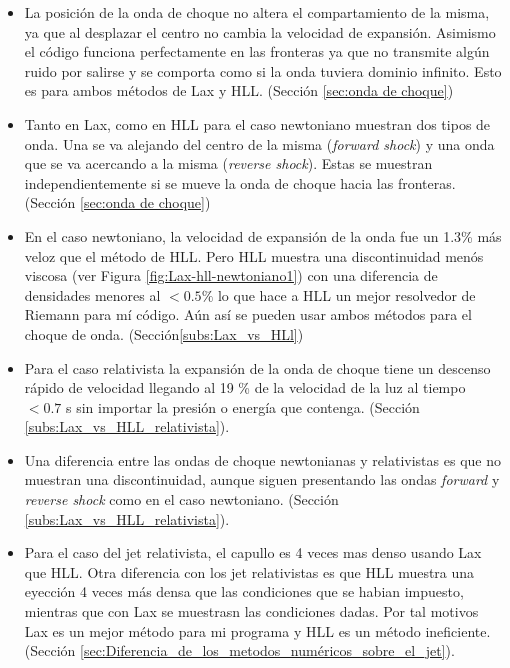 \documentclass[12pt,a4paper]{book}
\begin{document}
\begin{itemize}
\item La posición de la onda de choque no altera el compartamiento de la misma, ya que al desplazar el centro no cambia la velocidad de expansión. Asimismo el código funciona perfectamente en las fronteras ya que no transmite algún ruido por salirse y se comporta como si la onda tuviera dominio infinito. Esto es para ambos métodos de Lax y HLL. (Sección \ref{sec:onda de choque})

\item Tanto en Lax, como en HLL para el caso newtoniano muestran dos tipos de onda. Una se va alejando del centro de la misma (\emph{forward shock}) y una onda que se va acercando a la misma (\emph{reverse shock}). Estas se muestran independientemente si se mueve la onda de choque hacia las fronteras. (Sección \ref{sec:onda de choque})

\item En el caso newtoniano, la velocidad de expansión de la onda fue un 1.3\% más veloz que el método de HLL. Pero HLL muestra una discontinuidad menós viscosa (ver Figura \ref{fig:Lax-hll-newtoniano1}) con una diferencia de densidades menores al $<0.5 \% $ lo que hace 
a HLL un mejor resolvedor de Riemann para mí código. Aún así se pueden usar ambos métodos para el choque de onda. (Sección\ref{subs:Lax_vs_HLl})

\item Para el caso relativista la expansión de la onda de choque tiene un descenso rápido de velocidad llegando al 19 \% de la velocidad de la luz al tiempo $< 0.7$ s sin importar la presión o energía que contenga. (Sección \ref{subs:Lax_vs_HLL_relativista}).

\item Una diferencia entre las ondas de choque newtonianas y relativistas es que no muestran una discontinuidad, aunque siguen presentando las ondas \emph{forward} y \emph{reverse shock} como en el caso newtoniano. (Sección \ref{subs:Lax_vs_HLL_relativista}).

\item Para el caso del jet relativista, el capullo es 4 veces mas denso usando Lax que HLL. Otra diferencia con los jet relativistas es que HLL muestra una eyección 4 veces más densa que las condiciones que se habian impuesto, mientras que con Lax se muestrasn las condiciones dadas. Por tal motivos Lax es un mejor método para mi programa y HLL es un método ineficiente. (Sección \ref{sec:Diferencia_de_los_metodos_numéricos_sobre_el_jet}).


\end{itemize}
\end{document}
